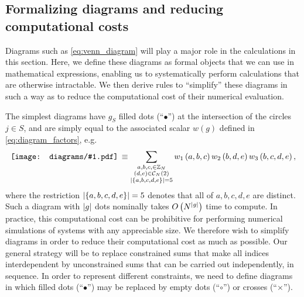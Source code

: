 \documentclass[nofootinbib,notitlepage,11pt]{revtex4-2}
\newcommand{\p}[1]{\left(#1\right)} %
\renewcommand{\set}[1]{\left\{#1\right\}} %
\newcommand{\1}{\mathds{1}}
\newcommand{\C}{\mathcal{C}}
\newcommand{\ZZ}{\mathbb{Z}}
\newcommand{\diagram}[1]
{\,\texttt{[image: diagrams/\#1.pdf]}\,}
\begin{document}
\subsection{Formalizing diagrams and reducing computational costs}
\label{sec:diagrams}

Diagrams such as \eqref{eq:venn_diagram} will play a major role in the
calculations in this section.  Here, we define these diagrams as
formal objects that we can use in mathematical expressions, enabling
us to systematically perform calculations that are otherwise
intractable.  We then derive rules to ``simplify'' these diagrams in
such a way as to reduce the computational cost of their numerical
evaluation.

The simplest diagrams have $g_S$ filled dots (``$\bullet$'') at the
intersection of the circles $j\in S$, and are simply equal to the
associated scalar $w\p{g}$ defined in \eqref{eq:diagram_factors}, e.g.
\begin{align}
  \diagram{example_123}
  \equiv \sum_{\substack{a,b,c,\in\ZZ_N\\\p{d,e}\in\C_N\p{2}\\
      \abs{\set{a,b,c,d,e}}=5}}
  w_1\p{a,b,c} w_2\p{b,d,e} w_3\p{b,c,d,e},
\end{align}
where the restriction $\abs{\set{a,b,c,d,e}}=5$ denotes that all of
$a,b,c,d,e$ are distinct.  Such a diagram with $\abs{g}$ dots
nominally takes $O\p{N^{\abs{g}}}$ time to compute.  In practice, this
computational cost can be prohibitive for performing numerical
simulations of systems with any appreciable size.  We therefore wish
to simplify diagrams in order to reduce their computational cost as
much as possible.  Our general strategy will be to replace constrained
sums that make all indices interdependent by unconstrained sums that
can be carried out independently, in sequence.  In order to represent
different constraints, we need to define diagrams in which filled dots
(``$\bullet$'') may be replaced by empty dots (``$\circ$'') or crosses
(``$\bm\times$'').
\end{document}
